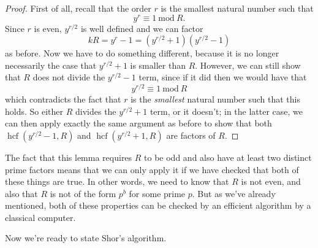 \documentclass[fleqn,a4paper]{article}
\theoremstyle{definition}
\theoremstyle{definition}
\theoremstyle{definition}
\theoremstyle{definition}
\theoremstyle{remark}
\begin{document}
\begin{proof}
First of all, recall that the order \(r\) is the smallest natural number such that
\[
  y^r\equiv1\ \mathrm{mod}\ R.
\]
Since \(r\) is even, \(y^{r/2}\) is well defined and we can factor
\[
  kR=y^r-1=(y^{r/2}+1)(y^{r/2}-1)
\]
as before.
Now we have to do something different, because it is no longer necessarily the case that \(y^{r/2}+1\) is smaller than \(R\).
However, we can still show that \(R\) does not divide the \(y^{r/2}-1\) term, since if it did then we would have that
\[
  y^{r/2}\equiv1\ \mathrm{mod}\ R
\]
which contradicts the fact that \(r\) is the \emph{smallest} natural number such that this holds.
So either \(R\) divides the \(y^{r/2}+1\) term, or it doesn't; in the latter case, we can then apply exactly the same argument as before to show that both \(\operatorname{hcf}(y^{r/2}-1,R)\) and \(\operatorname{hcf}(y^{r/2}+1,R)\) are factors of \(R\).
\end{proof}

The fact that this lemma requires \(R\) to be odd and also have at least two distinct prime factors means that we can only apply it if we have checked that both of these things are true.
In other words, we need to know that \(R\) is not even, and also that \(R\) is not of the form \(p^b\) for some prime \(p\).
But as we've already mentioned, both of these properties can be checked by an efficient algorithm by a classical computer.

Now we're ready to state Shor's algorithm.
\end{document}
